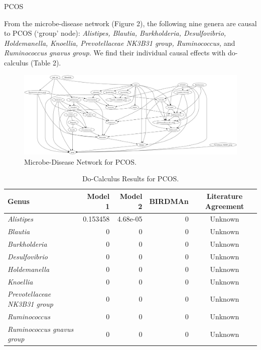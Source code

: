 \documentclass[final]{beamer}
\newlength{\colwidth}
\begin{document}
\begin{frame}[t]
\begin{columns}[t]
\begin{column}{\colwidth}

   \begin{block}{PCOS}

    From the microbe-disease network (Figure 2), the following nine genera are causal to PCOS (`group' node): \textit{Alistipes, Blautia, Burkholderia, Desulfovibrio, Holdemanella, Knoellia, Prevotellaceae NK3B31 group, Ruminococcus,} and \textit{Ruminococcus gnavus group}. We find their individual causal effects with do-calculus (Table 2). 

    \begin{figure}
      \centering
      \includegraphics[width=\linewidth]{../graphs/pcos/cdnod_norm.png}
      \caption{Microbe-Disease Network for PCOS.}
    \end{figure}
    
    \begin{table}
      \centering
      \begin{tabular}{l r r r c}
        \toprule
        \textbf{Genus} & \textbf{Model 1} & \textbf{Model 2} & \textbf{BIRDMAn} & \textbf{Literature Agreement} \\
        \midrule
        \textit{Alistipes} & 0.153458 & 4.68e-05 & 0 & Unknown \\
        \textit{Blautia} & 0 & 0 & 0 & Unknown \\
        \textit{Burkholderia} & 0 & 0 & 0 & Unknown \\
        \textit{Desulfovibrio} & 0 & 0 & 0 & Unknown \\
        \textit{Holdemanella} & 0 & 0 & 0 & Unknown \\
        \textit{Knoellia} & 0 & 0 & 0 & Unknown \\
        \textit{Prevotellaceae NK3B31 group} & 0 & 0 & 0 & Unknown \\
        \textit{Ruminococcus} & 0 & 0 & 0 & Unknown \\
        \textit{Ruminococcus gnavus group} & 0 & 0 & 0 & Unknown \\
        \bottomrule
      \end{tabular}
      \caption{Do-Calculus Results for PCOS.}
    \end{table}
    

\end{block}
\end{column}
\end{columns}
\end{frame}
\end{document}
